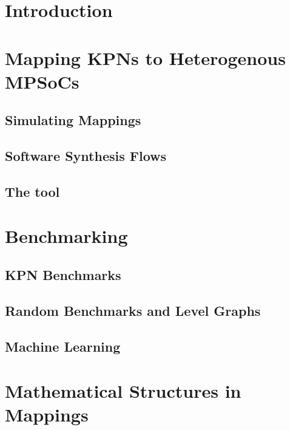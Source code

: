\documentclass[
		twoside,openright,titlepage,numbers=noenddot,headinclude,%
	 	footinclude=true,cleardoublepage=empty,
		dottedtoc, %
		BCOR=5mm,paper=a4,fontsize=10pt, %
		ngerman,american, %
		]{scrreprt}
\begin{document}
\chapter{Introduction}


%
\chapter{Mapping KPNs to Heterogenous MPSoCs}
\label{chap:mapping}


\section{Simulating Mappings}
\label{sec:simulating_mappings}

\section{Software Synthesis Flows}
\label{sec:software_synthesis_flows}

\section{The \mocasin tool}
\label{sec:mocasin}


\chapter{Benchmarking}
\label{chap:benchmarking}

\section{KPN Benchmarks}
\label{sec:kpn_benchmarks}

\section{Random Benchmarks and Level Graphs}
\label{sec:level_graphs}
\section{Machine Learning}
\label{sec:machine_learning}


\chapter{Mathematical Structures in Mappings}
\label{chap:mapping_structures}

\end{document}
